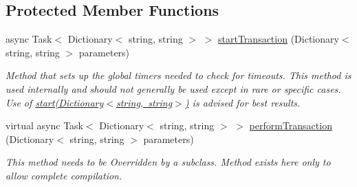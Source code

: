 \subsection*{Protected Member Functions}
\begin{DoxyCompactItemize}
\item 
async Task$<$ Dictionary$<$ string, string $>$ $>$ \mbox{\hyperlink{class_form_sim_1_1_generic_handler_a8cb06afb7f6aed51488c7418491b9dd3}{start\+Transaction}} (Dictionary$<$ string, string $>$ parameters)
\begin{DoxyCompactList}\small\item\em Method that sets up the global timers needed to check for timeouts. This method is used internally and should not generally be used except in rare or specific cases. Use of \mbox{\hyperlink{class_form_sim_1_1_generic_handler_affac9485687a2be1595405d657922532}{start(\+Dictionary$<$string, string$>$)}} is advised for best results. \end{DoxyCompactList}\item 
virtual async Task$<$ Dictionary$<$ string, string $>$ $>$ \mbox{\hyperlink{class_form_sim_1_1_generic_handler_a824697e5c22a4f1cf8ce4e512b6954ad}{perform\+Transaction}} (Dictionary$<$ string, string $>$ parameters)
\begin{DoxyCompactList}\small\item\em This method needs to be Overridden by a subclass. Method exists here only to allow complete compilation. \end{DoxyCompactList}\end{DoxyCompactItemize}
